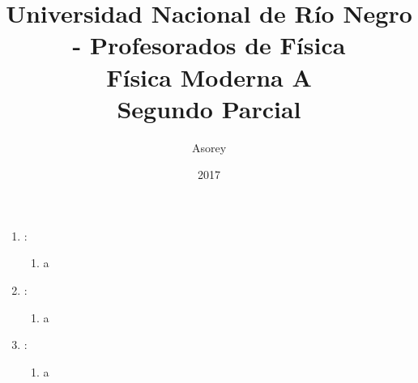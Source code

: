 \documentclass[a4paper,12pt]{article}
\begin{document}
\title{
{\normalsize{Universidad Nacional de Río Negro - Profesorados de Física}}\\
Física Moderna A \\ Segundo Parcial\\}
\author{Asorey}
\date{2017}
\maketitle

\begin{enumerate}
\setcounter{enumi}{0}

	\item {\bf{}}:\\
		\begin{enumerate}
			\item a
		\end{enumerate}
	\item {\bf{}}:\\
		\begin{enumerate}
			\item a
		\end{enumerate}
	\item {\bf{}}:\\
		\begin{enumerate}
			\item a
		\end{enumerate}
\end{enumerate}
\end{document}
